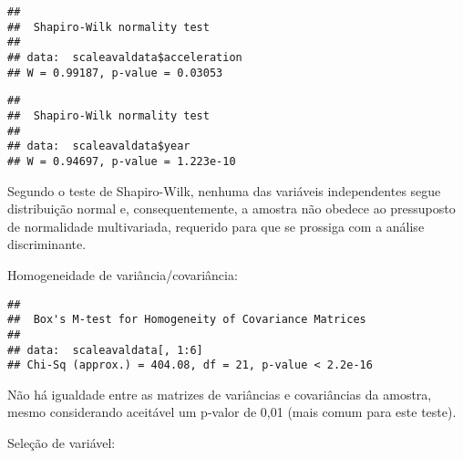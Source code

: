 \documentclass[]{article}
\newenvironment{Shaded}{\begin{snugshade}}{\end{snugshade}}
\newcommand{\KeywordTok}[1]{\textcolor[rgb]{0.13,0.29,0.53}{\textbf{#1}}}
\newcommand{\DataTypeTok}[1]{\textcolor[rgb]{0.13,0.29,0.53}{#1}}
\newcommand{\DecValTok}[1]{\textcolor[rgb]{0.00,0.00,0.81}{#1}}
\newcommand{\OperatorTok}[1]{\textcolor[rgb]{0.81,0.36,0.00}{\textbf{#1}}}
\newcommand{\NormalTok}[1]{#1}
\begin{document}
\begin{Shaded}
\end{Shaded}

\begin{verbatim}
## 
##  Shapiro-Wilk normality test
## 
## data:  scaleavaldata$acceleration
## W = 0.99187, p-value = 0.03053
\end{verbatim}

\begin{Shaded}
\end{Shaded}

\begin{verbatim}
## 
##  Shapiro-Wilk normality test
## 
## data:  scaleavaldata$year
## W = 0.94697, p-value = 1.223e-10
\end{verbatim}

Segundo o teste de Shapiro-Wilk, nenhuma das variáveis independentes
segue distribuição normal e, consequentemente, a amostra não obedece ao
pressuposto de normalidade multivariada, requerido para que se prossiga
com a análise discriminante.

Homogeneidade de variância/covariância:

\begin{Shaded}
\end{Shaded}

\begin{verbatim}
## 
##  Box's M-test for Homogeneity of Covariance Matrices
## 
## data:  scaleavaldata[, 1:6]
## Chi-Sq (approx.) = 404.08, df = 21, p-value < 2.2e-16
\end{verbatim}

Não há igualdade entre as matrizes de variâncias e covariâncias da
amostra, mesmo considerando aceitável um p-valor de 0,01 (mais comum
para este teste).

Seleção de variável:
\end{document}
